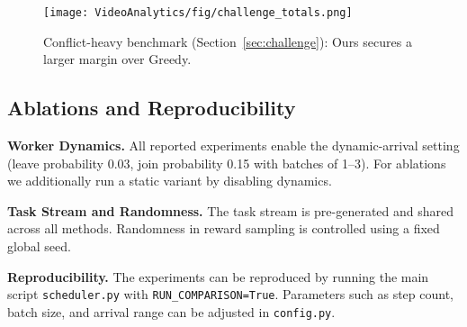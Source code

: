 \begin{figure}[t]
\centering
\texttt{[image: VideoAnalytics/fig/challenge\_totals.png]}
\caption{Conflict-heavy benchmark (Section~\ref{sec:challenge}): Ours secures a larger margin over Greedy.}
\label{fig:challenge_totals}
\end{figure}

\subsection{Ablations and Reproducibility}

\textbf{Worker Dynamics.} All reported experiments enable the dynamic-arrival setting (leave probability 0.03, join probability 0.15 with batches of 1–3). For ablations we additionally run a static variant by disabling dynamics.

\textbf{Task Stream and Randomness.} The task stream is pre-generated and shared across all methods. Randomness in reward sampling is controlled using a fixed global seed.

\textbf{Reproducibility.} The experiments can be reproduced by running the main script \texttt{scheduler.py} with \texttt{RUN\_COMPARISON=True}. Parameters such as step count, batch size, and arrival range can be adjusted in \texttt{config.py}.
